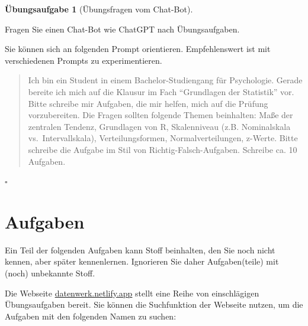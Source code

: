 \documentclass[
  letterpaper,
]{scrbook}
\theoremstyle{definition}
\newtheorem{exercise}{Übungsaufgabe}[chapter]
\theoremstyle{definition}
\theoremstyle{definition}
\theoremstyle{remark}
\begin{document}
\begin{exercise}[Übungsfragen vom
Chat-Bot]\protect\hypertarget{exr-chatgpt}{}\label{exr-chatgpt}

Fragen Sie einen Chat-Bot wie ChatGPT nach Übungsaufgaben.

Sie können sich an folgenden Prompt orientieren. Empfehlenswert ist mit
verschiedenen Prompts zu experimentieren.

\begin{quote}
{} Ich bin ein Student in einem Bachelor-Studiengang für
Psychologie. Gerade bereite ich mich auf die Klausur im Fach
\enquote{Grundlagen der Statistik} vor. Bitte schreibe mir Aufgaben, die
mir helfen, mich auf die Prüfung vorzubereiten. Die Fragen sollten
folgende Themen beinhalten: Maße der zentralen Tendenz, Grundlagen von
R, Skalenniveau (z.B. Nominalskala vs.~Intervallskala),
Verteilungsformen, Normalverteilungen, z-Werte. Bitte schreibe die
Aufgabe im Stil von Richtig-Falsch-Aufgaben. Schreibe ca. 10 Aufgaben.
\end{quote}

\(\square\)

\end{exercise}

\section{Aufgaben}\label{aufgaben-4}

Ein Teil der folgenden Aufgaben kann Stoff beinhalten, den Sie noch
nicht kennen, aber später kennenlernen. Ignorieren Sie daher
Aufgaben(teile) mit (noch) unbekannte Stoff.

Die Webseite \href{https://datenwerk.netlify.app}{datenwerk.netlify.app}
stellt eine Reihe von einschlägigen Übungsaufgaben bereit. Sie können
die Suchfunktion der Webseite nutzen, um die Aufgaben mit den folgenden
Namen zu suchen:
\end{document}
